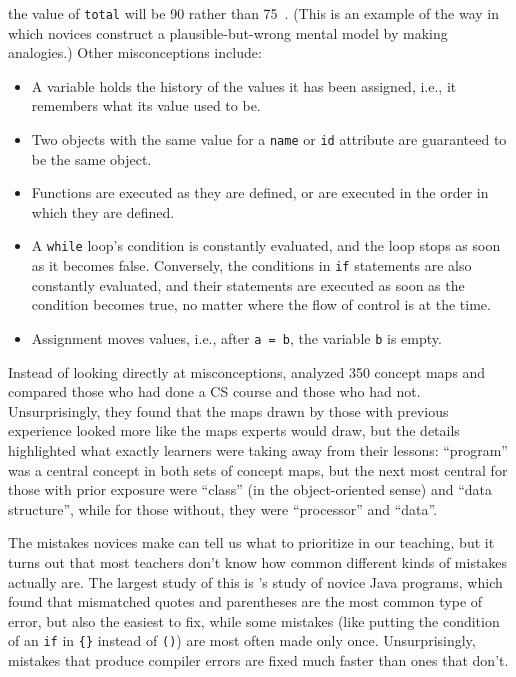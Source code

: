 the value of \texttt{total} will be 90 rather than 75~\cite{Kohn2017}.
(This is an example of the way in which novices construct a
plausible-but-wrong mental model by making analogies.) Other
misconceptions include:

\begin{itemize}
\item
  A variable holds the history of the values it has been assigned,
  i.e., it remembers what its value used to be.
\item
  Two objects with the same value for a \texttt{name} or \texttt{id} attribute are
  guaranteed to be the same object.
\item
  Functions are executed as they are defined, or are executed in the
  order in which they are defined.
\item
  A \texttt{while} loop's condition is constantly evaluated, and the loop
  stops as soon as it becomes false. Conversely, the conditions in
  \texttt{if} statements are also constantly evaluated, and their statements
  are executed as soon as the condition becomes true, no matter where
  the flow of control is at the time.
\item
  Assignment moves values, i.e., after \texttt{a\ =\ b}, the variable \texttt{b} is
  empty.
\end{itemize}

Instead of looking directly at misconceptions, \cite{Muhl2016}
analyzed 350 concept maps and compared those who had done a CS course
and those who had not. Unsurprisingly, they found that the maps drawn by
those with previous experience looked more like the maps experts would
draw, but the details highlighted what exactly learners were taking away
from their lessons: ``program'' was a central concept in both sets of
concept maps, but the next most central for those with prior exposure
were ``class'' (in the object-oriented sense) and ``data structure'', while
for those without, they were ``processor'' and ``data''.


The mistakes novices make can tell us what to prioritize in our
teaching, but it turns out that most teachers don't know how common
different kinds of mistakes actually are. The largest study of this is
\cite{Brow2017}'s study of novice Java programs, which found that
mismatched quotes and parentheses are the most common type of error, but
also the easiest to fix, while some mistakes (like putting the condition
of an \texttt{if} in \texttt{\{\}} instead of \texttt{()}) are most often made only once.
Unsurprisingly, mistakes that produce compiler errors are fixed much
faster than ones that don't.

